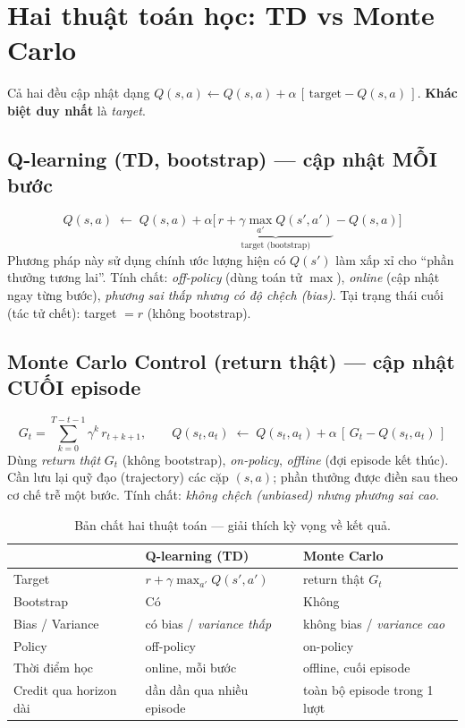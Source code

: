 \documentclass[11pt,a4paper]{article}
\begin{document}
\section{Hai thuật toán học: TD vs Monte Carlo}\label{sec:algos}

Cả hai đều cập nhật dạng $Q(s,a) \leftarrow Q(s,a) + \alpha\,[\,\text{target} - Q(s,a)\,]$.
\textbf{Khác biệt duy nhất} là \emph{target}.

\subsection{Q-learning (TD, bootstrap) --- cập nhật MỖI bước}
\begin{equation}
Q(s,a)\;\leftarrow\;Q(s,a) + \alpha\Big[\,\underbrace{r + \gamma\max_{a'}Q(s',a')}_{\text{target (bootstrap)}} - Q(s,a)\Big]
\end{equation}
Phương pháp này sử dụng chính ước lượng hiện có $Q(s')$ làm xấp xỉ cho ``phần thưởng tương lai''.
Tính chất: \emph{off-policy} (dùng toán tử $\max$), \emph{online} (cập nhật ngay từng bước),
\emph{phương sai thấp nhưng có độ chệch (bias)}. Tại trạng thái cuối (tác tử chết): target $=r$
(không bootstrap).

\subsection{Monte Carlo Control (return thật) --- cập nhật CUỐI episode}
\begin{equation}
G_t = \sum_{k=0}^{T-t-1}\gamma^{k}\,r_{t+k+1}, \qquad
Q(s_t,a_t)\;\leftarrow\;Q(s_t,a_t) + \alpha\,[\,G_t - Q(s_t,a_t)\,]
\end{equation}
Dùng \emph{return thật} $G_t$ (không bootstrap), \emph{on-policy}, \emph{offline} (đợi episode kết
thúc). Cần lưu lại quỹ đạo (trajectory) các cặp $(s,a)$; phần thưởng được điền sau theo cơ chế trễ
một bước. Tính chất: \emph{không chệch (unbiased) nhưng phương sai cao}.

\begin{table}[h]
\centering
\caption{Bản chất hai thuật toán --- giải thích kỳ vọng về kết quả.}
\label{tab:tdvsmc}
\small
\begin{tabular}{lll}
\toprule
& \textbf{Q-learning (TD)} & \textbf{Monte Carlo} \\
\midrule
Target                 & $r+\gamma\max_{a'}Q(s',a')$ & return thật $G_t$ \\
Bootstrap              & Có & Không \\
Bias / Variance        & có bias / \emph{variance thấp} & không bias / \emph{variance cao} \\
Policy                 & off-policy & on-policy \\
Thời điểm học          & online, mỗi bước & offline, cuối episode \\
Credit qua horizon dài & dần dần qua nhiều episode & toàn bộ episode trong 1 lượt \\
\bottomrule
\end{tabular}
\end{table}
\end{document}
